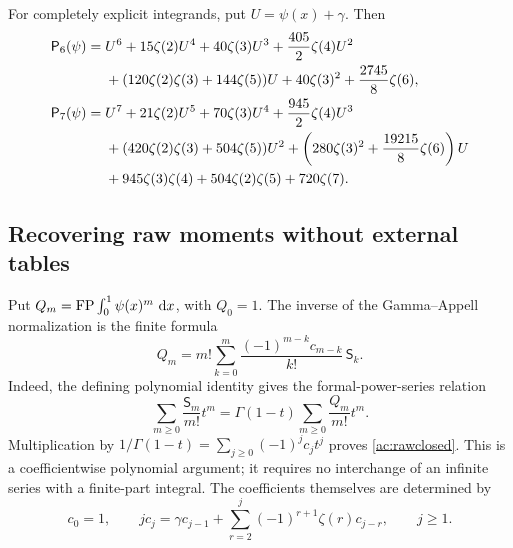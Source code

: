For completely explicit integrands, put $U=\psi(x)+\gamma$.
Then
\begin{align}\label{ac:P6}
 \mathsf P_6(\psi)={}&U^6+15\zeta(2)U^4+40\zeta(3)U^3
       +\frac{405}{2}\zeta(4)U^2\notag\\
 &+(120\zeta(2)\zeta(3)+144\zeta(5))U
       +40\zeta(3)^2+\frac{2745}{8}\zeta(6),\\
 \mathsf P_7(\psi)={}&U^7+21\zeta(2)U^5+70\zeta(3)U^4
       +\frac{945}{2}\zeta(4)U^3\notag\\
 &+(420\zeta(2)\zeta(3)+504\zeta(5))U^2
       +\left(280\zeta(3)^2+\frac{19215}{8}\zeta(6)\right)U\notag\\
 &+945\zeta(3)\zeta(4)+504\zeta(2)\zeta(5)+720\zeta(7).
       \label{ac:P7}
\end{align}
\subsection{Recovering raw moments without external tables}

Put $Q_m=\operatorname{FP}\int_0^1\psi(x)^m\,\,\mathrm d x$, with $Q_0=1$.
The inverse of the Gamma--Appell normalization is the finite formula
\begin{equation}\label{ac:rawclosed}
 \boxed{\displaystyle
 Q_m=m!\sum_{k=0}^m\frac{(-1)^{m-k}c_{m-k}}{k!}\,\mathsf S_k.}
\end{equation}
Indeed, the defining polynomial identity gives the formal-power-series
relation
\[
 \sum_{m\ge0}\frac{\mathsf S_m}{m!}t^m
   =\Gamma(1-t)\sum_{m\ge0}\frac{Q_m}{m!}t^m.
\]
Multiplication by $1/\Gamma(1-t)=\sum_{j\ge0}(-1)^jc_jt^j$
proves \eqref{ac:rawclosed}. This is a coefficientwise polynomial
argument; it requires no interchange of an infinite series with a
finite-part integral. The coefficients themselves are determined by
\begin{equation}\label{ac:crecurrence}
 c_0=1,\qquad
 j c_j=\gamma c_{j-1}
       +\sum_{r=2}^j(-1)^{r+1}\zeta(r)c_{j-r},\qquad j\ge1.
\end{equation}

